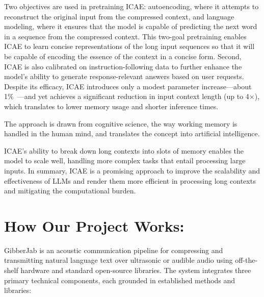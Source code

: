 \documentclass[12pt,openany]{article}
\theoremstyle{definition}
\theoremstyle{definition}
\theoremstyle{definition}
\begin{document}
Two objectives are used in pretraining ICAE: autoencoding, where it attempts to reconstruct the original input from the compressed context, and language modeling, where it ensures that the model is capable of predicting the next word in a sequence from the compressed context. This two-goal pretraining enables ICAE to learn concise representations of the long input sequences so that it will be capable of encoding the essence of the context in a concise form. Second, ICAE is also calibrated on instruction-following data to further enhance the model's ability to generate response-relevant answers based on user requests. Despite its efficacy, ICAE introduces only a modest parameter increase—about 1\%\ —and yet achieves a significant reduction in input context length (up to 4×), which translates to lower memory usage and shorter inference times.

The approach is drawn from cognitive science, the way working memory is handled in the human mind, and translates the concept into artificial intelligence.

ICAE's ability to break down long contexts into slots of memory enables the model to scale well, handling more complex tasks that entail processing large inputs. In summary, ICAE is a promising approach to improve the scalability and effectiveness of LLMs and render them more efficient in processing long contexts and mitigating the computational burden. 

\section*{How Our Project Works:}
GibberJab is an acoustic communication pipeline for compressing and transmitting natural language text over ultrasonic or audible audio using off-the-shelf hardware and standard open-source libraries. The system integrates three primary technical components, each grounded in established methods and libraries:
\end{document}
